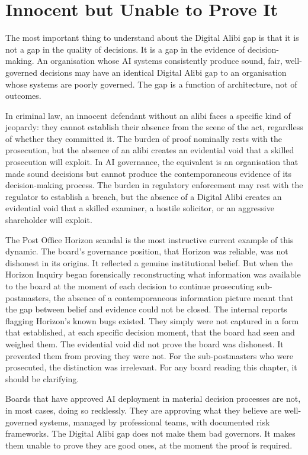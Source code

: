 \section{Innocent but Unable to Prove It}

The most important thing to understand about the Digital Alibi gap is that it is not a gap in the quality of decisions. It is a gap in the evidence of decision-making. An organisation whose AI systems consistently produce sound, fair, well-governed decisions may have an identical Digital Alibi gap to an organisation whose systems are poorly governed. The gap is a function of architecture, not of outcomes.

In criminal law, an innocent defendant without an alibi faces a specific kind of jeopardy: they cannot establish their absence from the scene of the act, regardless of whether they committed it. The burden of proof nominally rests with the prosecution, but the absence of an alibi creates an evidential void that a skilled prosecution will exploit. In AI governance, the equivalent is an organisation that made sound decisions but cannot produce the contemporaneous evidence of its decision-making process. The burden in regulatory enforcement may rest with the regulator to establish a breach, but the absence of a Digital Alibi creates an evidential void that a skilled examiner, a hostile solicitor, or an aggressive shareholder will exploit.

The Post Office Horizon scandal is the most instructive current example of this dynamic. The board's governance position, that Horizon was reliable, was not dishonest in its origins. It reflected a genuine institutional belief. But when the Horizon Inquiry began forensically reconstructing what information was available to the board at the moment of each decision to continue prosecuting sub-postmasters, the absence of a contemporaneous information picture meant that the gap between belief and evidence could not be closed. The internal reports flagging Horizon's known bugs existed. They simply were not captured in a form that established, at each specific decision moment, that the board had seen and weighed them. The evidential void did not prove the board was dishonest. It prevented them from proving they were not. For the sub-postmasters who were prosecuted, the distinction was irrelevant. For any board reading this chapter, it should be clarifying.

Boards that have approved AI deployment in material decision processes are not, in most cases, doing so recklessly. They are approving what they believe are well-governed systems, managed by professional teams, with documented risk frameworks. The Digital Alibi gap does not make them bad governors. It makes them unable to prove they are good ones, at the moment the proof is required.

